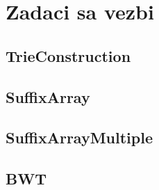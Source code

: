 \section{Zadaci sa vezbi}

\setexamplecodestyle
\subsection{TrieConstruction}


\subsection{SuffixArray}


\subsection{SuffixArrayMultiple}


\subsection{BWT}

